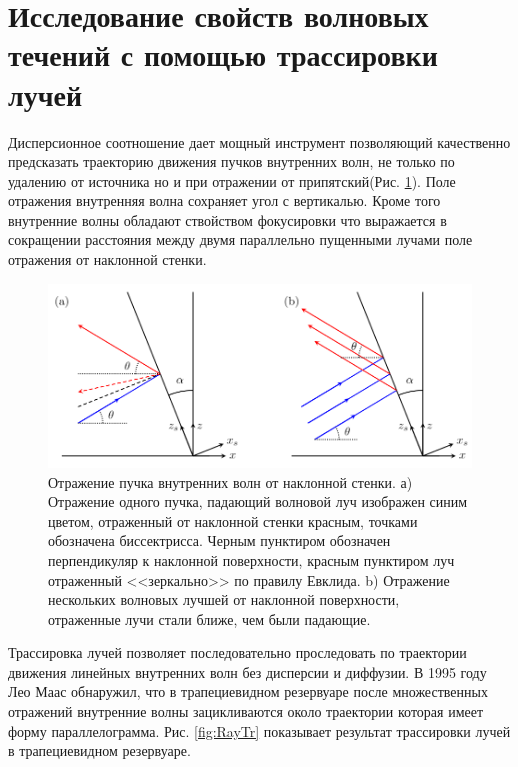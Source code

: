 

\section{Исследование свойств волновых течений с помощью трассировки лучей}

Дисперсионное соотношение дает мощный инструмент позволяющий качественно предсказать траекторию движения пучков внутренних волн, не только по удалению от источника но и при отражении от припятский(Рис. \ref{fig:internalReflection}). Поле отражения внутренняя волна сохраняет угол с вертикалью. Кроме того внутренние волны обладают ствойством фокусировки что выражается в сокращении расстояния между двумя параллельно пущенными лучами поле отражения от наклонной стенки. 

\begin{figure}
    \centering
    \includegraphics[scale=0.5]{Figs/angle_of_reflection.png}
    \caption{Отражение пучка внутренних волн от наклонной стенки. а) Отражение одного пучка, падающий волновой луч изображен синим цветом, отраженный от наклонной стенки красным, точками обозначена биссектрисса. Черным пунктиром обозначен перпендикуляр к наклонной поверхности, красным пунктиром луч отраженный <<зеркально>> по правилу Евклида. b) Отражение нескольких волновых лучшей от наклонной поверхности, отраженные лучи стали ближе, чем были падающие.}
    \label{fig:internalReflection}
\end{figure}

Трассировка лучей позволяет последовательно проследовать по траектории движения линейных внутренних волн без дисперсии и диффузии. В 1995 году Лео Маас обнаружил, что в трапециевидном резервуаре после множественных отражений внутренние волны зацикливаются около траектории которая имеет форму параллелограмма\cite{Maas1995}. Рис. \ref{fig:RayTr} показывает результат трассировки лучей в трапециевидном резервуаре.

